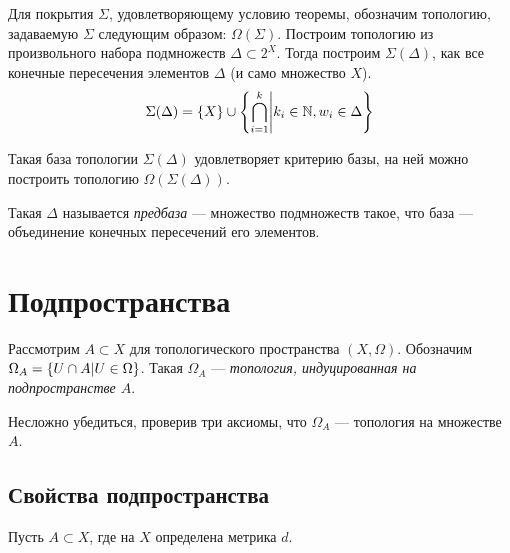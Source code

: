 \documentclass[a4paper]{report}
\begin{document}
    Для покрытия $\Sigma$, удовлетворяющему условию теоремы, обозначим топологию, задаваемую $\Sigma$ следующим образом: $\Omega(\Sigma)$.
    \ok
    Построим топологию из произвольного набора подмножеств $\Delta \subset 2^X$.
    Тогда построим $\Sigma(\Delta)$, как все конечные пересечения элементов $\Delta$ (и само множество $X$).
    \[\Sigma(\Delta) = \{X\} \cup \left\{\bigcap\limits_{i = 1}^{k}\middle|k_i \in \mathbb{N}, w_i \in \Delta\right\}\]

    Такая база топологии $\Sigma(\Delta)$ удовлетворяет критерию базы, на ней можно построить топологию $\Omega(\Sigma(\Delta))$.

    Такая $\Delta$ называется \emph{предбаза} --- множество подмножеств такое, что база --- объединение конечных пересечений его элементов.


    \section{Подпространства}
    Рассмотрим $A \subset X$ для топологического пространства $(X, \Omega)$.
    Обозначим $\Omega_A = \left\{U \cap A\middle|U \in \Omega\right\}$.
    Такая $\Omega_A$ --- \emph{топология, индуцированная на подпространстве $A$}.

    Несложно убедиться, проверив три аксиомы, что $\Omega_A$ --- топология на множестве $A$.

    \subsection{Свойства подпространства}
    Пусть $A \subset X$, где на $X$ определена метрика $d$.
\end{document}
